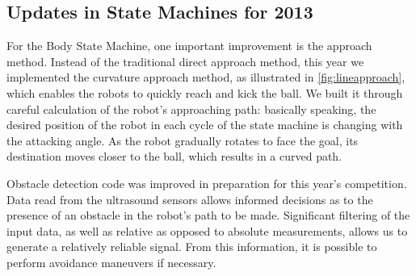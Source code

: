 \documentclass{article}
\begin{document}
  \subsection{Updates in State Machines for 2013}
    For the Body State Machine, one important improvement is the approach method. Instead of the traditional direct approach method, this year we implemented the curvature approach method, as illustrated in \ref{fig:lineapproach}, which enables the robots to quickly reach and kick the ball. We built it through careful calculation of the robot's approaching path: basically speaking, the desired position of the robot in each cycle of the state machine is changing with the attacking angle. As the robot gradually rotates to face the goal, its destination moves closer to the ball, which results in a curved path.  
 
  	Obstacle detection code was improved in preparation for this year’s competition. Data read from the ultrasound sensors allows informed decisions as to the presence of an obstacle in the robot’s path to be made. Significant filtering of the input data, as well as relative as opposed to absolute measurements, allows us to generate a relatively reliable signal. From this information, it is possible to perform avoidance maneuvers if necessary.
   
\end{document}
